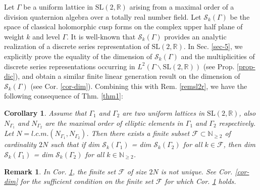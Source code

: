 \documentclass[11 pt]{amsart}
\newcommand{\R}{{\mathbb R}}
\newcommand{\N}{{\mathbb N}}
\newtheorem{corollary}{Corollary}[section]
\theoremstyle{definition}
\newtheorem{remark}{Remark}[section]
\numberwithin{equation}{section}
\begin{document}
Let $\Gamma$ be a uniform lattice in $\mathrm{SL}(2, \R)$ arising from a maximal order of a division quaternion algebra over a totally real number field. Let $\mathcal{S}_k(\Gamma)$ be the space of classical holomorphic cusp forms on the complex upper half plane of weight $k$ and level $\Gamma$. It is well-known that $\mathcal{S}_k(\Gamma)$ provides an analytic realization of a discrete series representation of $\mathrm{SL}(2, \R)$. In Sec. \ref{sec-5}, we explicitly prove the equality of the dimension of $\mathcal{S}_k(\Gamma)$ and the multiplicities of discrete series representations occurring in $L^2(\Gamma \backslash \mathrm{SL}(2, \R))$ (see Prop. \ref{prop-dic}), and obtain a similar finite linear generation result on the dimension of $\mathcal{S}_k(\Gamma)$ (see Cor. \ref{cor-dim}). Combining this with Rem. \ref{remsl2r}, we have the following consequence of Thm. \ref{thm1}: 

\vspace{2pt}

\begin{corollary}\label{cor52}
\textit{Assume that $\Gamma_1$ and $\Gamma_2$ are two uniform lattices in $\mathrm{SL}(2, \R)$, also $N_{\Gamma_1}$ and $N_{\Gamma_2}$ are the maximal order of elliptic elements in $\Gamma_1$ and $\Gamma_2$ respectively. Let $N=l.c.m.(N_{\Gamma_1}, N_{\Gamma_2})$. Then there exists a finite subset $\mathcal{F}  \subset \N_{\geq 2}$ of cardinality $2N$ such that if dim $\mathcal{S}_k(\Gamma_1)$ = dim $\mathcal{S}_k(\Gamma_2)$ for all $k \in \mathcal{F}$, then dim $\mathcal{S}_k(\Gamma_1)$ = dim $\mathcal{S}_k(\Gamma_2)$ for all $k \in \N_{\geq 2}$.}
\end{corollary}


\begin{remark}
\textit{In Cor. \ref{cor52}, the finite set $\mathcal{F}$ of size $2N$ is not unique. See Cor. \ref{cor-dim} for the sufficient condition on the finite set $\mathcal{F}$ for which Cor. \ref{cor52} holds. } 
\end{remark}



\end{document}
